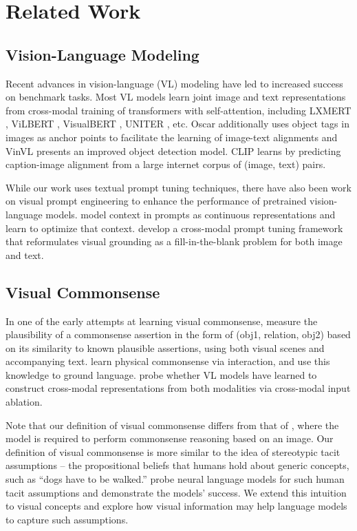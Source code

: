 \documentclass[11pt]{article}
\begin{document}
\section{Related Work}

\subsection{Vision-Language Modeling}

Recent advances in vision-language (VL) modeling have led to increased success on benchmark tasks. Most VL models learn joint image and text representations from cross-modal training of transformers with self-attention, including LXMERT \citep{tan2019lxmert}, ViLBERT \citep{Lu2019ViLBERT}, VisualBERT \citep{li2019visualbert}, UNITER \citep{uniter}, etc.
Oscar \citep{li2020oscar} additionally uses object tags in images as anchor points to facilitate the learning of image-text alignments and VinVL \citep{zhang2021vinvl} presents an improved object detection model. CLIP \citep{clip} learns by predicting caption-image alignment from a large internet corpus of (image, text) pairs.


While our work uses textual prompt tuning techniques, there have also been work on visual prompt engineering to enhance the performance of pretrained vision-language models. \citet{zhou2021coop} model context in prompts as continuous representations and learn to optimize that context.
\citet{Yao2021CPTCP} develop a cross-modal prompt tuning framework that reformulates visual grounding as a fill-in-the-blank problem for both image and text.

\subsection{Visual Commonsense}

In one of the early attempts at learning visual commonsense, \citet{Vedantam2015LearningCS} measure the plausibility of a commonsense assertion in the form of (obj1, relation, obj2) based on its similarity to known plausible assertions, using both visual scenes and accompanying text. \citet{zellers-etal-2021-piglet} learn physical commonsense via interaction, and use this knowledge to ground language. \citet{Frank2021VisionandLanguageOV} probe whether VL models have learned to construct cross-modal representations from both modalities via cross-modal input ablation. 

Note that our definition of visual commonsense differs from that of  \citet{zellers2019vcr}, where the model is required to perform commonsense reasoning based on an image.
Our definition of visual commonsense is more similar to the idea of stereotypic tacit assumptions \citep{prince1978} -- the propositional beliefs that humans hold about generic concepts, such as ``dogs have to be walked.'' \citet{tacit-assumption} probe neural language models for such human tacit assumptions and demonstrate the models' success. We extend this intuition to visual concepts and explore how visual information may help language models to capture such assumptions.
\end{document}
